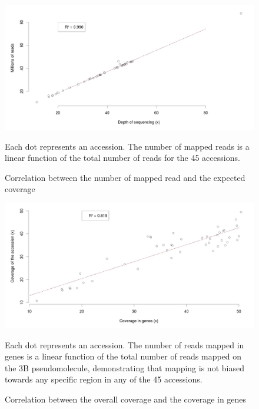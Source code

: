\documentclass[a4paper, 12pt]{article}
\begin{document}
\begin{onehalfspace}
\newpage 
\thispagestyle{empty}

    \begin{figure}
    \vspace{-1.8cm}
      \centering \includegraphics[scale=0.2]{Figures/Figure_10.jpg}
      \vspace{0.5cm}
      \caption{Correlation between the number of mapped read and the expected coverage} 
          \label{fig:F10}
        \footnotesize{Each dot represents an accession. The number of mapped reads is a linear function of the total number of reads for the 45 accessions.}
    \end{figure}
    \begin{figure}
    \vspace{-1cm}
      \centering \includegraphics[scale=0.2]{Figures/Figure_11.jpg}
      \vspace{0.5cm}
      \caption{Correlation between the overall coverage and the coverage in genes} 
      \label{fig:F11}
    \footnotesize{Each dot represents an accession. The number of reads mapped in genes is a linear function of the total number of reads mapped on the 3B pseudomolecule, demonstrating that mapping is not biased towards any specific region in any of the 45 accessions.}

\end{figure}
\end{onehalfspace}
\end{document}
